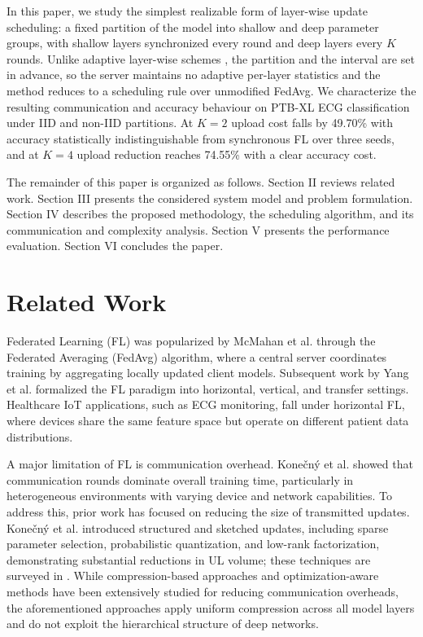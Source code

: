 \documentclass[10pt,conference]{IEEEtran}
\begin{document}
In this paper, we study the simplest realizable form of layer-wise update scheduling: a fixed partition of the model into shallow and deep parameter groups, with shallow layers synchronized every round and deep layers every $K$ rounds. Unlike adaptive layer-wise schemes \cite{xu2021layerwise}, the partition and the interval are set in advance, so the server maintains no adaptive per-layer statistics and the method reduces to a scheduling rule over unmodified FedAvg. We characterize the resulting communication and accuracy behaviour on PTB-XL ECG classification under IID and non-IID partitions. At $K=2$ upload cost falls by 49.70\% with accuracy statistically indistinguishable from synchronous FL over three seeds, and at $K=4$ upload reduction reaches 74.55\% with a clear accuracy cost.

The remainder of this paper is organized as follows. Section II reviews related work. Section III presents the considered system model and problem formulation. Section IV describes the proposed methodology, the scheduling algorithm, and its communication and complexity analysis. Section V presents the performance evaluation. Section VI concludes the paper.
\section{Related Work}

Federated Learning (FL) was popularized by McMahan et al. \cite{mcmahan2017} through the Federated Averaging (FedAvg) algorithm, where a central server coordinates training by aggregating locally updated client models. Subsequent work by Yang et al. \cite{yang2019} formalized the FL paradigm into horizontal, vertical, and transfer settings. Healthcare IoT applications, such as ECG monitoring, fall under horizontal FL, where devices share the same feature space but operate on different patient data distributions.

A major limitation of FL is communication overhead. Konečný et al. \cite{konecny2016} showed that communication rounds dominate overall training time, particularly in heterogeneous environments with varying device and network capabilities. To address this, prior work has focused on reducing the size of transmitted updates. Kone\v{c}n\'y et al. \cite{konecny2016strategies} introduced structured and sketched updates, including sparse parameter selection, probabilistic quantization, and low-rank factorization, demonstrating substantial reductions in UL volume; these techniques are surveyed in \cite{hartmann2018}. While compression-based approaches \cite{lin2018deepgradient} and optimization-aware methods \cite{reddi2021adaptive,karimireddy2020scaffold} have been extensively studied for reducing communication overheads, the aforementioned approaches apply uniform compression across all model layers and do not exploit the hierarchical structure of deep networks.
\end{document}
